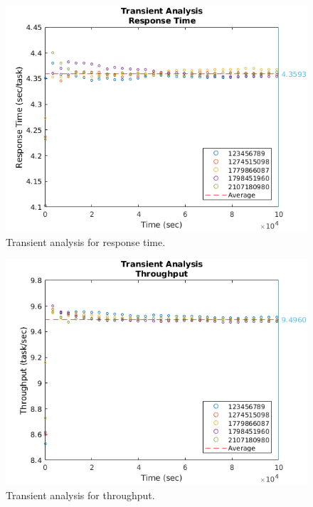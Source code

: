 \begin{figure}
	\includegraphics[width=\columnwidth]{fig/evaluation-transient-analysis-response-time}
	\caption{Transient analysis for response time.}
	\label{fig:evaluation-transient-analysis-response-time}
\end{figure}

\begin{figure}
	\includegraphics[width=\columnwidth]{fig/evaluation-transient-analysis-throughput}
	\caption{Transient analysis for throughput.}
	\label{fig:evaluation-transient-analysis-throughput}
\end{figure}

